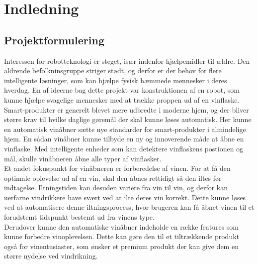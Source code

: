 \chapter{Indledning}
\section{Projektformulering}
Interessen for robotteknologi er steget, især indenfor hjælpemidler til ældre. Den aldrende befolkninsgruppe striger stødt, og derfor er der behov for flere 
intelligente løsninger, som kan hjælpe fysisk hæmmede mennesker i deres hverdag. En af ideerne bag dette projekt var konstruktionen af en robot, som kunne hjælpe 
svagelige mennesker med at trække proppen ud af en vinflaske.\\

Smart-produkter er generelt blevet mere udbredte i moderne hjem, og der bliver større krav til hvilke daglige gøremål der skal kunne løses automatisk. Her kunne 
en automatisk vinåbner sætte nye standarder for smart-produkter i almindelige hjem. En sådan vinåbner kunne tilbyde en ny og innoverende måde at åbne en 
vinflaske. Med intelligente enheder som kan detektere vinflaskens postionen og mål, skulle vinåbneren åbne alle typer af vinflasker. \\

Et andet fokuspunkt for vinåbneren er forberedelse af vinen. For at få den optimale oplevelse ud af en vin, skal den åbnes rettidigt så den iltes før indtagelse.
Iltningstiden kan desuden variere fra vin til vin, og derfor kan uerfarne vindrikkere have svært ved at ilte deres vin korrekt. Dette kunne løses ved at 
automatisere denne iltningsprocess, hvor brugeren kan få åbnet vinen til et forudstemt tidspunkt bestemt ud fra vinens type.\\

Derudover kunne den automatiske vinåbner indeholde en række features som kunne forbedre vinoplevelsen. Dette kan gøre den til et tiltrækkende produkt også for 
vinentusiaster, som ønsker et premium produkt der kan give dem en større nydelse ved vindrikning.\\


